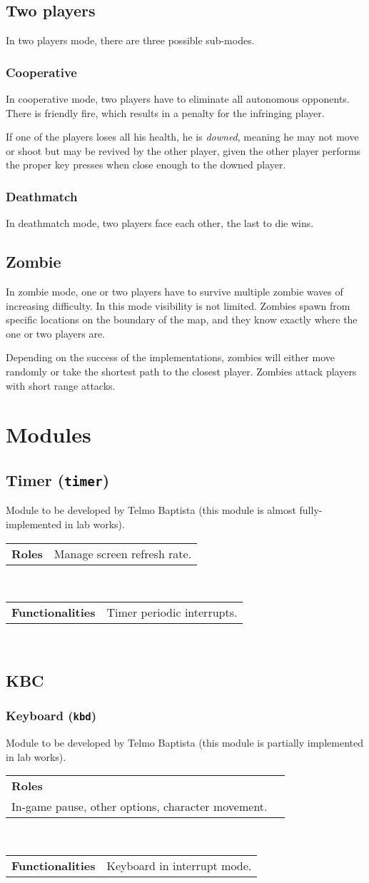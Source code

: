 \documentclass{article}
\theoremstyle{remark}
\newcommand{\role}[1]{
\begin{tabular}{l l}
	\begin{minipage}[t]{30mm} \textbf{Roles} \end{minipage} &
	\begin{minipage}[t]{125mm} #1 \end{minipage}
\end{tabular}\\
}
\newcommand{\func}[1]{
\begin{tabular}{l l}
	\begin{minipage}[t]{30mm} \textbf{Functionalities} \end{minipage} &
	\begin{minipage}[t]{125mm} #1 \end{minipage}
\end{tabular}\\
}
\begin{document}
\subsection{Two players}
In two players mode, there are three possible sub-modes.
\subsubsection*{Cooperative}
In cooperative mode, two players have to eliminate all autonomous opponents. There is friendly fire, which results in a penalty for the infringing player.\par
If one of the players loses all his health, he is \textit{downed}, meaning he may not move or shoot but may be revived by the other player, given the other player performs the proper key presses when close enough to the downed player.
\subsubsection*{Deathmatch}
In deathmatch mode, two players face each other, the last to die wins.
\subsection{Zombie}
In zombie mode, one or two players have to survive multiple zombie waves of increasing difficulty. In this mode visibility is not limited. Zombies spawn from specific locations on the boundary of the map, and they know exactly where the one or two players are.\par
Depending on the success of the implementations, zombies will either move randomly or take the shortest path to the closest player. Zombies attack players with short range attacks.
\section{Modules}
\subsection{Timer (\texttt{timer})}
Module to be developed by Telmo Baptista (this module is almost fully-implemented in lab works).\\
\role{Manage screen refresh rate.}
\func{Timer periodic interrupts.}
\subsection{KBC}
\subsubsection{Keyboard (\texttt{kbd})}
Module to be developed by Telmo Baptista (this module is partially implemented in lab works).\\
\role{
Filling text fields.\\
In-game pause, other options, character movement.
}
\func{Keyboard in interrupt mode.}
\end{document}
